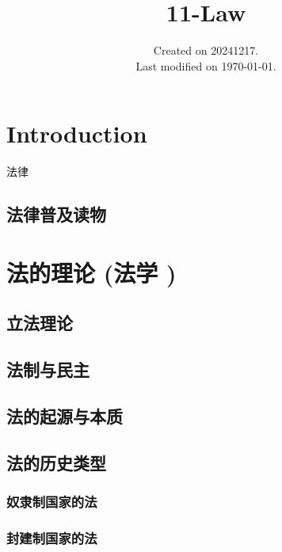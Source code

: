 \documentclass[UTF8]{../ApplicationUniverse}
\begin{document}
\title{11-Law}
\date{Created on 20241217.\\   Last modified on \today.}
\maketitle
\tableofcontents


\chapter{Introduction}
法律

\section{法律普及读物}



  
\chapter{法的理论 (法学 )}

\section{立法理论}
\section{法制与民主}
\section{法的起源与本质}
\section{法的历史类型}
    \subsection{奴隶制国家的法}
    \subsection{封建制国家的法}
\end{document}
